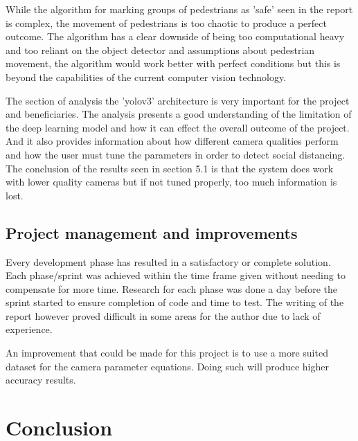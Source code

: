 \documentclass[12pt]{report}
\begin{document}
\vspace{2mm}

While the algorithm for marking groups of pedestrians as 'safe' seen in the report is complex, the movement of pedestrians is too chaotic to produce a perfect outcome. The algorithm has a clear downside of being too computational heavy and too reliant on the object detector and assumptions about pedestrian movement, the algorithm would work better with perfect conditions but this is beyond the capabilities of the current computer vision technology. 

\vspace{2mm}

The section of analysis the 'yolov3' architecture is very important for the project and beneficiaries. The analysis presents a good understanding of the limitation of the deep learning model and how it can effect the overall outcome of the project. And it also provides information about how different camera qualities perform and how the user must tune the parameters in order to detect social distancing. The conclusion of the results seen in section 5.1 is that the system does work with lower quality cameras but if not tuned properly, too much information is lost.


\subsection{Project management and improvements}

Every development phase has resulted in a satisfactory or complete solution. Each phase/sprint was achieved within the time frame given without needing to compensate for more time. Research for each phase was done a day before the sprint started to ensure completion of code and time to test. The writing of the report however proved difficult in some areas for the author due to lack of experience.

\vspace{2mm}

An improvement that could be made for this project is to use a more suited dataset for the camera parameter equations. Doing such will produce higher accuracy results.

\vspace{2mm}


\section{Conclusion}
\end{document}
